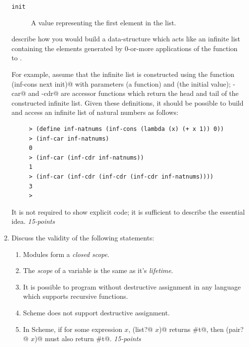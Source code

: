 \documentclass[12pt]{article}
\begin{document}
\begin{enumerate}
\begin{description}
\item[\texttt{init}] 
 A value representing the first element in the list.
\end{description}

  describe how you would build a
  data-structure which acts like an infinite list containing the
  elements generated by 0-or-more applications of the \verb@next@
  function to \verb@init@.

  For example, assume that the infinite list is constructed using the
  function \verb@(inf-cons next init)@ with parameters \verb@next@ (a
  function) and \verb@init@ (the initial value); \verb@inf-car@ and
  \verb@inf-cdr@ are accessor functions which return the head and tail
  of the constructed infinite list.  Given these definitions, it
  should be possible to build and access an infinite list of natural
  numbers as follows:

   \begin{verbatim}
     > (define inf-natnums (inf-cons (lambda (x) (+ x 1)) 0))
     > (inf-car inf-natnums)
     0
     > (inf-car (inf-cdr inf-natnums))
     1
     > (inf-car (inf-cdr (inf-cdr (inf-cdr inf-natnums))))
     3
     >   
   \end{verbatim}

   It is not required to show explicit code; it is sufficient to
   describe the essential idea.  \hfill{\textit{15-points}}
   
\item Discuss the validity of the following statements:

  \begin{enumerate}

  \item Modules form a \textit{closed scope}.

  \item The \textit{scope} of a variable is the same as it's
    \textit{lifetime}.

  \item It is possible to program without destructive assignment
    in any language which supports recursive functions.

  \item Scheme does not support destructive assignment.

    \item In Scheme, if for some expression $x$, \verb@(list?@
      $x$\verb@)@ returns \verb@#t@, then \verb@(pair?@ $x$\verb@)@
      must also return \verb@#t@. \hfill{\textit{15-points}}


  \end{enumerate}
  
\end{enumerate}
\end{document}
